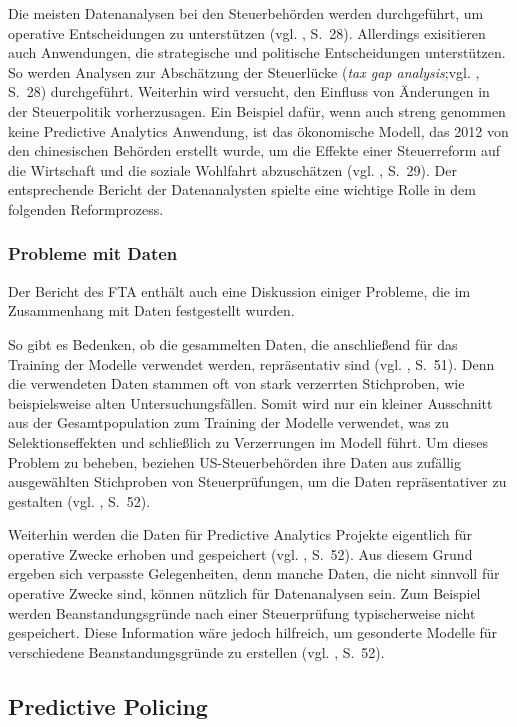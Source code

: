 Die meisten Datenanalysen bei den Steuerbehörden werden durchgeführt, um operative
Entscheidungen zu unterstützen (vgl. \cite{OECD}, S.~28). Allerdings exisitieren auch
Anwendungen, die strategische und politische Entscheidungen unterstützen. So werden
Analysen zur Abschätzung der Steuerlücke (\emph{tax gap analysis};vgl. \cite{OECD}, S.~28) durchgeführt.
Weiterhin wird versucht, den Einfluss von Änderungen in der Steuerpolitik vorherzusagen. Ein Beispiel
dafür, wenn auch streng genommen keine Predictive Analytics Anwendung, ist das ökonomische Modell, das
2012 von den chinesischen Behörden erstellt wurde, um die Effekte einer Steuerreform auf die Wirtschaft
und die soziale Wohlfahrt abzuschätzen (vgl. \cite{OECD}, S.~29). Der entsprechende Bericht der
Datenanalysten spielte eine wichtige Rolle in dem folgenden Reformprozess.

\subsubsection{Probleme mit Daten}

Der Bericht des FTA enthält auch eine Diskussion einiger Probleme, die im Zusammenhang mit Daten
festgestellt wurden.

So gibt es Bedenken, ob die gesammelten Daten, die anschließend für das Training der Modelle verwendet werden,
repräsentativ sind (vgl. \cite{OECD}, S.~51). Denn die verwendeten Daten stammen oft von stark verzerrten
Stichproben, wie beispielsweise alten Untersuchungsfällen. Somit wird nur ein kleiner Ausschnitt aus der
Gesamtpopulation zum Training der Modelle verwendet, was zu Selektionseffekten und schließlich zu Verzerrungen
im Modell führt. Um dieses Problem zu beheben, beziehen US-Steuerbehörden ihre Daten aus zufällig ausgewählten
Stichproben von Steuerprüfungen, um die Daten repräsentativer zu gestalten (vgl. \cite{OECD}, S.~52).

Weiterhin werden die Daten für Predictive Analytics Projekte eigentlich für operative Zwecke erhoben und
gespeichert (vgl. \cite{OECD}, S.~52). Aus diesem Grund ergeben sich verpasste Gelegenheiten, denn manche Daten, die nicht sinnvoll
für operative Zwecke sind, können nützlich für Datenanalysen sein. Zum Beispiel werden Beanstandungsgründe nach
einer Steuerprüfung typischerweise nicht gespeichert. Diese Information wäre jedoch hilfreich, um gesonderte Modelle
für verschiedene Beanstandungsgründe zu erstellen (vgl. \cite{OECD}, S.~52). 

\subsection{Predictive Policing}

